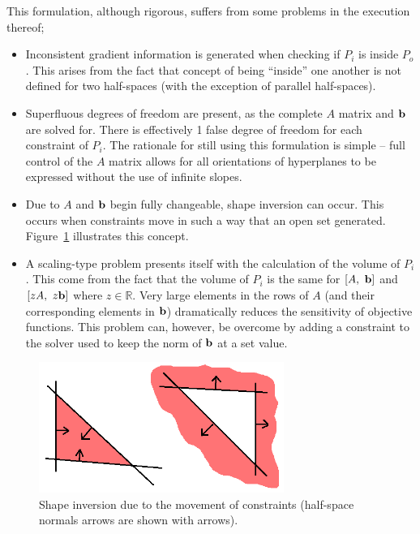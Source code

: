 This formulation, although rigorous, suffers from some problems in the execution thereof;
\begin{itemize}
\item Inconsistent gradient information is generated when checking if $P_i$ is inside $P_o$.
This arises from the fact that concept of being ``inside'' one another is not defined for two half-spaces (with the exception of parallel half-spaces).
\item Superfluous degrees of freedom are present, as the complete $A$ matrix and ${\bf {b}}$ are solved for.
There is effectively 1 false degree of freedom for each constraint of $P_i$.
The rationale for still using this formulation is simple -- full control of the $A$ matrix allows for all orientations of hyperplanes to be expressed without the use of infinite slopes.
\item Due to $A$ and ${\bf {b}}$ begin fully changeable, shape inversion can occur.
This occurs when constraints move in such a way that an open set generated.
Figure~\ref{fig:shapeinversion} illustrates this concept.
\item A scaling-type problem presents itself with the calculation of the volume of $P_i$.
This come from the fact that the volume of $P_i$ is the same for $[A,~ {\bf {b}}]$ and $[zA,~z{\bf {b}}]$ where $z\in \mathbb{R}$.
Very large elements in the rows of $A$ (and their corresponding elements in ${\bf {b}}$) dramatically reduces the sensitivity of objective functions.
This problem can, however, be overcome by adding a constraint to the solver used to keep the norm of ${\bf {b}}$ at a set value.
\end{itemize}

\begin{figure}[htbp]
  \centering
  \includegraphics[width=8cm]{graph/shapeinversion}
  \caption[Shape inversion example]{Shape inversion due to the movement of constraints (half-space normals arrows are shown with arrows).}
  \label{fig:shapeinversion}
\end{figure}

